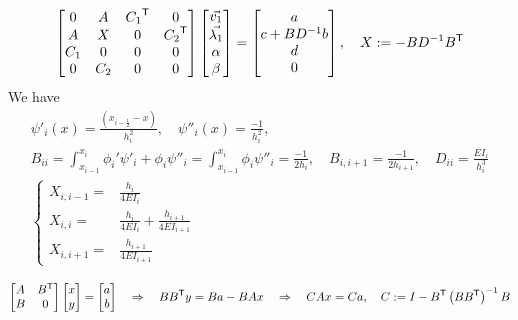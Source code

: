 %
\begin{align*}
\begin{bmatrix}
0 & {A}& {C_1}^{\mathsf{T}}&0\\
A & X& 0&{C_2}^{\mathsf{T}}\\
C_1 & 0  & 0& 0\\
0 & C_2  & 0& 0
\end{bmatrix}
\begin{bmatrix}
\vec{v_1} \\ \vec{\lambda_1}\\ \alpha \\ \beta
\end{bmatrix}
=
\begin{bmatrix}
a  \\ c+ BD^{-1}b\\ d\\0
\end{bmatrix},\quad X:= -BD^{-1}{B}^{\mathsf{T}}
\end{align*}
%
We have
%
\begin{align*}
\psi'_i(x)=\frac{(x_{i-\frac12} -x)}{h_i^2},\quad
\psi''_i(x)=\frac{-1}{h_i^2},\\
B_{ii} = \int_{x_{i-1}}^{x_i} \phi_i'\psi'_i+\phi_i\psi''_i = \int_{x_{i-1}}^{x_i} \phi_i\psi''_i = \frac{-1}{2h_i},\quad
B_{i,i+1} = \frac{-1}{2h_{i+1}}, \quad D_{ii} = \frac{EI_i}{h_i^3}\\
%
\left\{
\begin{aligned}
X_{i,i-1} =& \frac{h_i}{4EI_i}\\
X_{i,i} =& \frac{h_i}{4EI_i}+\frac{h_{i+1}}{4EI_{i+1}}\\
X_{i,i+1} =& \frac{h_{i+1}}{4EI_{i+1}}
\end{aligned}
\right.
%
\end{align*}
%

\begin{align*}
\begin{bmatrix}
A & {B}^{\mathsf{T}}\\
B & 0
\end{bmatrix}
\begin{bmatrix}
x\\y
\end{bmatrix}
=
\begin{bmatrix}
a  \\ b
\end{bmatrix}
\quad\Rightarrow\quad 
B{B}^{\mathsf{T}}y = Ba- BA x
\quad\Rightarrow\quad 
CAx = Ca,\quad C:=I - {B}^{\mathsf{T}}\left(B{B}^{\mathsf{T}}\right)^{-1}B
\end{align*}


%
%
\printbibliography[title=References Section~\thesection]
